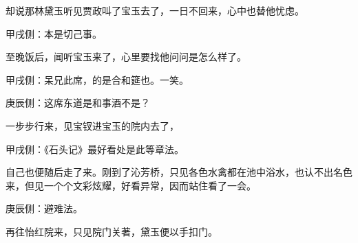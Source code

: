 \begin{parag}
    却说那林黛玉听见贾政叫了宝玉去了，一日不回来，心中也替他忧虑。\begin{note}甲戌侧：本是切己事。\end{note}至晚饭后，闻听宝玉来了，心里要找他问问是怎么样了。\begin{note}甲戌侧：呆兄此席，的是合和筵也。一笑。\end{note}\begin{note}庚辰侧：这席东道是和事酒不是？\end{note}一步步行来，见宝钗进宝玉的院内去了，\begin{note}甲戌侧：《石头记》最好看处是此等章法。\end{note}自己也便随后走了来。刚到了沁芳桥，只见各色水禽都在池中浴水，也认不出名色来，但见一个个文彩炫耀，好看异常，因而站住看了一会。\begin{note}庚辰侧：避难法。\end{note}再往怡红院来，只见院门关著，黛玉便以手扣门。
\end{parag}


